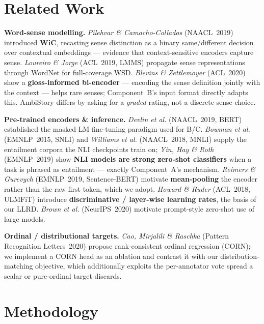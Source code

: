 \documentclass[11pt]{article}
\begin{document}
\section{Related Work}
\textbf{Word-sense modelling.} \emph{Pilehvar \& Camacho-Collados}
(NAACL~2019) introduced \textbf{WiC}, recasting sense distinction as a binary
same/different decision over contextual embeddings --- evidence that
context-sensitive encoders capture sense. \emph{Loureiro \& Jorge} (ACL~2019,
LMMS) propagate sense representations through WordNet for full-coverage WSD.
\emph{Blevins \& Zettlemoyer} (ACL~2020) show a \textbf{gloss-informed
bi-encoder} --- encoding the sense definition jointly with the context ---
helps rare senses; Component~B's input format directly adapts this. AmbiStory
differs by asking for a \emph{graded} rating, not a discrete sense choice.

\textbf{Pre-trained encoders \& inference.} \emph{Devlin et al.} (NAACL~2019,
BERT) established the masked-LM fine-tuning paradigm used for B/C.
\emph{Bowman et al.} (EMNLP~2015, SNLI) and \emph{Williams et al.}
(NAACL~2018, MNLI) supply the entailment corpora the NLI checkpoints train
on; \emph{Yin, Hay \& Roth} (EMNLP~2019) show \textbf{NLI models are strong
zero-shot classifiers} when a task is phrased as entailment --- exactly
Component~A's mechanism. \emph{Reimers \& Gurevych} (EMNLP~2019, Sentence-BERT)
motivate \textbf{mean-pooling} the encoder rather than the raw first token,
which we adopt. \emph{Howard \& Ruder} (ACL~2018, ULMFiT) introduce
\textbf{discriminative / layer-wise learning rates}, the basis of our LLRD.
\emph{Brown et al.} (NeurIPS~2020) motivate prompt-style zero-shot use of
large models.

\textbf{Ordinal / distributional targets.} \emph{Cao, Mirjalili \& Raschka}
(Pattern Recognition Letters~2020) propose rank-consistent ordinal regression
(CORN); we implement a CORN head as an ablation and contrast it with our
distribution-matching objective, which additionally exploits the per-annotator
vote spread a scalar or pure-ordinal target discards.

\section{Methodology}
\end{document}
